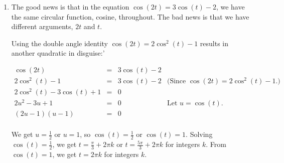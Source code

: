 \documentclass{ximera}
\begin{document}
\begin{example}
\begin{explanation}
\begin{enumerate}
This gives $u = -1$ or $u = 2$.  Since $u = \tan(\theta)$, we have $\tan(\theta) = -1$ or $\tan(\theta) = 2$. 

 

From $\tan(\theta) = -1$, we get $\theta = -\frac{\pi}{4} + \pi k$ for integers $k$.  To solve $\tan(\theta) = 2$, we employ the arctangent function and get $\theta = \arctan(2) + \pi k$ for integers $k$.  

 

From the first set of solutions, we get $\theta = \frac{3\pi}{4}$ and $\theta = \frac{7\pi}{4}$ as our answers which lie in $[0,2\pi)$.  

 

Using the same sort of argument we saw in Example \ref{TrigEqnEx1},   we get  $\theta=\arctan(2) \approx 1.107$ and $\theta = \pi + \arctan(2) \approx 4.249$ as answers from our second set of solutions which lie in $[0,2\pi)$.  

 

We verify our solutions below graphically.  
\begin{center}
\end{center}

\item  The good news is that in the equation $\cos(2t) = 3\cos(t) - 2$, we have the same circular function, cosine,  throughout.  The bad news is that we have different arguments, $2t$ and $t$.  

 

Using the double angle identity $\cos(2t) = 2\cos^{2}(t) - 1$ results in another quadratic in disguise:'

\[ \begin{array}{rclr}

\cos(2t) & = & 3\cos(t) - 2 & \\
2\cos^{2}(t) -1 & = & 3\cos(t) -2 & \text{(Since $\cos(2t) = 2\cos^{2}(t) -1$.)} \\
2\cos^{2}(t) - 3\cos(t) +1 & = & 0 & \\
2 u^2 - 3 u + 1 & = & 0 & \text{Let $u = \cos(t)$.}\\
(2u - 1)(u - 1) & = & 0 & \\ \end{array} \]

We get $u = \frac{1}{2}$ or $u = 1$, so   $\cos(t) = \frac{1}{2}$ or $\cos(t) = 1$. Solving  $\cos(t) = \frac{1}{2}$, we get $t = \frac{\pi}{3} + 2\pi k$ or $t = \frac{5\pi}{3} + 2\pi k$ for integers $k$.  From $\cos(t) = 1$, we get $t = 2\pi k$ for integers $k$.  


\end{enumerate}
\end{explanation}
\end{example}
\end{document}
